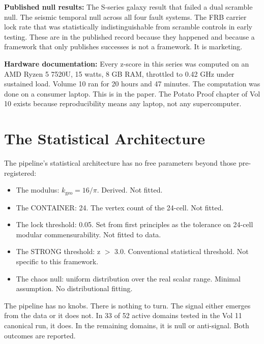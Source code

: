 \documentclass[11pt, letterpaper, openany]{book}
\begin{document}
\begin{newworld}
\textbf{Published null results:} The S-series galaxy result that
failed a dual scramble null. The seismic temporal null across all
four fault systems. The FRB carrier lock rate that was
statistically indistinguishable from scramble controls in early
testing. These are in the published record because they happened
and because a framework that only publishes successes is not a
framework. It is marketing.

\textbf{Hardware documentation:} Every z-score in this series
was computed on an AMD Ryzen 5 7520U, 15 watts, 8 GB RAM,
throttled to 0.42 GHz under sustained load. Volume 10 ran
for 20 hours and 47 minutes. The computation was done on a consumer
laptop. This is in the paper. The Potato Proof chapter of Vol 10
exists because reproducibility means any laptop, not any supercomputer.

\section{The Statistical Architecture}

The pipeline's statistical architecture has no free parameters
beyond those pre-registered:

\begin{itemize}
    \item The modulus: $k_\text{geo} = 16/\pi$. Derived. Not fitted.
    \item The CONTAINER: 24. The vertex count of the 24-cell. Not fitted.
    \item The lock threshold: 0.05. Set from first principles as the tolerance
    on 24-cell modular commensurability. Not fitted to data.
    \item The STRONG threshold: z $>$ 3.0. Conventional statistical threshold.
    Not specific to this framework.
    \item The chaos null: uniform distribution over the real scalar range.
    Minimal assumption. No distributional fitting.
\end{itemize}

The pipeline has no knobs. There is nothing to turn. The signal either
emerges from the data or it does not. In 33 of 52 active domains
tested in the Vol 11 canonical run, it does. In the remaining domains,
it is null or anti-signal. Both outcomes are reported.

\clearpage

\end{newworld}
\end{document}
